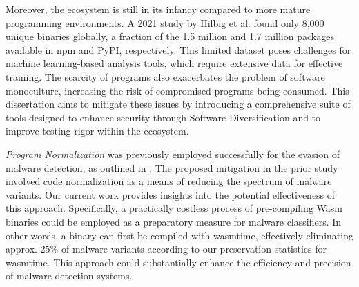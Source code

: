 Moreover, the \Wasm ecosystem is still in its infancy compared to more mature programming environments. 
A 2021 study by Hilbig et al. found only 8,000 unique \Wasm binaries globally\cite{Hilbig2021AnES}, a fraction of the 1.5 million and 1.7 million packages available in npm and PyPI, respectively. 
This limited dataset poses challenges for machine learning-based analysis tools, which require extensive data for effective training. 
The scarcity of \Wasm programs also exacerbates the problem of software monoculture, increasing the risk of compromised \Wasm programs being consumed\cite{usenixWasm2020}. 
This dissertation aims to mitigate these issues by introducing a comprehensive suite of tools designed to enhance \Wasm security through Software Diversification and to improve testing rigor within the ecosystem.


\emph{Program Normalization}
\tool was previously employed successfully for the evasion of malware detection, as outlined in \cite{CABRERAARTEAGA2023103296}. 
The proposed mitigation in the prior study involved code normalization as a means of reducing the spectrum of malware variants. 
Our current work provides insights into the potential effectiveness of this approach. 
Specifically, a practically costless process of pre-compiling Wasm binaries could be employed as a preparatory measure for malware classifiers. 
In other words, a \wasm binary can first be compiled with wasmtime, effectively eliminating approx. 25\% of malware variants according to our preservation statistics for wasmtime. 
This approach could substantially enhance the efficiency and precision of malware detection systems.


